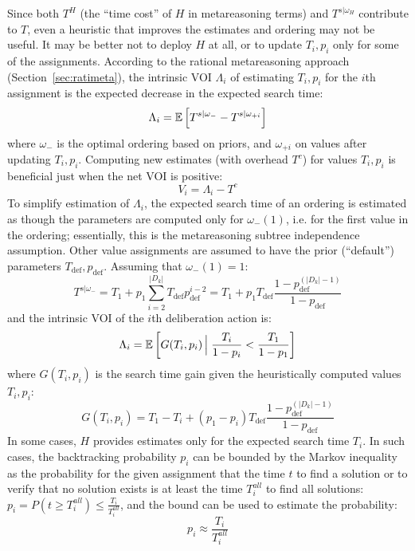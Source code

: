 Since both $T^H$ (the ``time cost'' of $H$ in metareasoning terms)
and $T^{s|\omega_H}$ contribute to $T$, even a heuristic that
improves the estimates and ordering may not be useful.  It may be better not
to deploy $H$ at all, or to update $T_i, p_i$ only for some of the assignments.
According to the rational metareasoning approach (Section~\ref{sec:ratimeta}),
the intrinsic VOI $\Lambda_i$ of estimating $T_i, p_i$ for the $i$th assignment
is the expected decrease in the expected search time:
\begin{equation}
\label{eq:value-ordering-benefit}
\Lambda_i=\mathbb{E}\left[T^{s|\omega_-}-T^{s|\omega_{+i}}\right]
\end{equation}
where $\omega_-$ is the optimal ordering based on priors,
and $\omega_{+i}$ on values after updating $T_i, p_i$.
Computing new estimates (with overhead $T^c$) for values $T_i, p_i$
is beneficial just when the net VOI is positive:
\begin{equation}
\label{eq:voi}
V_i=\Lambda_i-T^c
\end{equation}
To simplify estimation of $\Lambda_i$, the expected
search time of an ordering is estimated as though the parameters are
computed only for $\omega_-(1)$, i.e. for the first value in the ordering;
essentially, this is the metareasoning subtree independence assumption.
 Other value assignments are assumed to have the prior (``default'')
parameters $T_\mathrm{def}, p_\mathrm{def}$. Assuming  that $\omega_-(1)=1$:
\begin{equation}
\label{eq:time-estimate}
T^{s|\omega_-}=T_1+p_1\sum_{i=2}^{|D_k|}T_\mathrm{def}p_\mathrm{def}^{i-2}
   =T_1+p_1T_\mathrm{def}\frac{1-p_\mathrm{def}^{(|D_k|-1)}} {1-p_\mathrm{def}}
\end{equation}
and the intrinsic VOI of the $i$th deliberation action is:
\begin{equation}
\label{eq:benefit-estimate}
\Lambda_i=\mathbb{E}\left[G(T_i, p_i)\,\Big|\;\frac {T_i} {1-p_i} < \frac {T_1} {1-p_1}\right]
\end{equation}
where $G(T_i, p_i)$ is the search time gain given the heuristically computed values $T_i, p_i$:
\begin{equation}
\label{eq:gain}
G(T_i, p_i) = T_1-T_i+(p_1-p_i)T_\mathrm{def}\frac{1-p_\mathrm{def}^{(|D_k|-1)}}{1-p_\mathrm{def}}
\end{equation}
In some cases, $H$ provides estimates only for the expected
search time $T_i$. In such cases, the backtracking probability $p_i$
can be bounded by the Markov inequality as the probability for the
given assignment that the time $t$ to find a solution or to verify that
no solution exists is at least the time $T_i^{all}$ to find all
solutions: $p_i=P\left(t\ge T_i^{all}\right)\le \frac{T_i} {T_i^{all}}$, 
and the bound can be used to estimate the probability:
\begin{equation}
\label{eq:backtracking-probability-estimate}
p_i\approx\frac{T_i} {T_i^{all}}
\end{equation}

